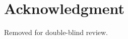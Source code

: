 \documentclass[conference]{IEEEtran}
\begin{document}
\section*{Acknowledgment}
Removed for double-blind review.

\enlargethispage{30pt}

\footnotesize
\setlength{\bibsep}{0pt}
\vspace{-4pt}

\end{document}
